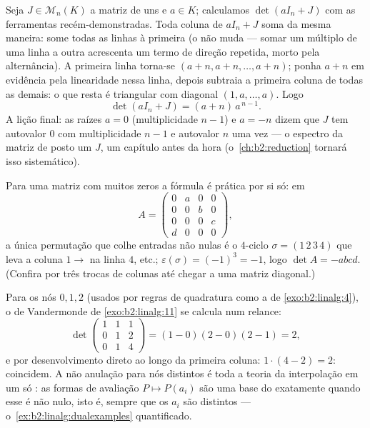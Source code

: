 \begin{example}\label{ex:b2:linalg:onesmatrix}
Seja $J \in \mathcal{M}_n(K)$ a matriz de uns e $a \in K$;
calculamos $\det(aI_n + J)$ com as ferramentas recém-demonstradas. Toda
coluna de $aI_n + J$ soma da mesma maneira: some todas as linhas à primeira
(o  não muda --- somar um múltiplo de uma linha a
outra acrescenta um termo de direção repetida, morto pela alternância).
A primeira linha torna-se $(a + n, a + n, \dots, a + n)$; ponha
$a + n$ em evidência pela linearidade nessa linha, depois subtraia a primeira coluna
de todas as demais: o que resta é triangular com diagonal
$(1, a, \dots, a)$. Logo
\[
\det(aI_n + J) = (a + n)\,a^{\,n-1}.
\]
A lição final: as raízes $a = 0$ (multiplicidade $n - 1$) e
$a = -n$ dizem que $J$ tem autovalor $0$ com multiplicidade $n - 1$
e autovalor $n$ uma vez --- o espectro da matriz de posto um
$J$, um capítulo antes da hora (o~\cref{ch:b2:reduction} tornará isso
sistemático).
\end{example}

\begin{example}\label{ex:b2:linalg:permexample}
Para uma matriz com muitos zeros a fórmula é prática por si só:
em
\[
A = \begin{pmatrix}
0 & a & 0 & 0\\
0 & 0 & b & 0\\
0 & 0 & 0 & c\\
d & 0 & 0 & 0
\end{pmatrix},
\]
a única permutação que colhe entradas não nulas é o $4$-ciclo
$\sigma = (1\,2\,3\,4)$ que leva a coluna $1 \to$ na linha $4$, etc.;
$\varepsilon(\sigma) = (-1)^3 = -1$, logo $\det A = -abcd$. (Confira
por três trocas de colunas até chegar a uma matriz diagonal.)
\end{example}

\begin{example}\label{ex:b2:linalg:vandermondework}
Para os nós $0, 1, 2$ (usados por regras de quadratura como a
de \cref{exo:b2:linalg:4}), o  de Vandermonde de
\cref{exo:b2:linalg:11} se calcula num relance:
\[
\det\begin{pmatrix}
1 & 1 & 1\\
0 & 1 & 2\\
0 & 1 & 4
\end{pmatrix}
= (1 - 0)(2 - 0)(2 - 1) = 2 ,
\]
e por desenvolvimento direto ao longo da primeira coluna: $1\cdot(4 - 2)
= 2$: coincidem. A não anulação para nós distintos é toda a
teoria da interpolação em um só : as formas de
avaliação $P \mapsto P(a_i)$ são uma base do  exatamente quando
esse  é não nulo, isto é, sempre que os $a_i$ são distintos
--- o~\cref{ex:b2:linalg:dualexamples} quantificado.
\end{example}

